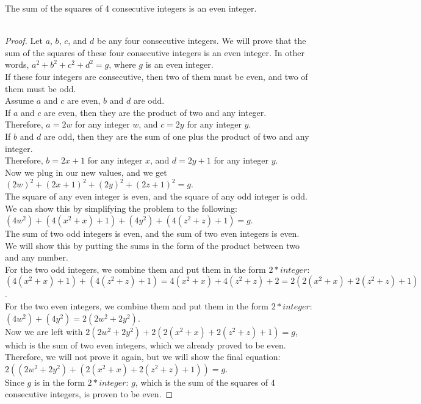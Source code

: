 \documentclass{amsart}
\theoremstyle{definition}
\theoremstyle{Exercise}
\theoremstyle{remark}
\theoremstyle{rule}
\numberwithin{equation}{section}
\begin{document}
The sum of the squares of 4 consecutive integers is an even integer.\\\\
\begin{proof}
Let $a$, $b$, $c$, and $d$ be any four consecutive integers.
We will prove that the sum of the squares of these four consecutive integers is an even integer. In other words, $a^2 + b^2 + c^2 + d^2 = g$, where $g$ is an even integer.\\
If these four integers are consecutive, then two of them must be even, and two of them must be odd.\\
Assume $a$ and $c$ are even, $b$ and $d$ are odd.\\
If $a$ and $c$ are even, then they are the product of two and any integer.\\
Therefore, $a = 2w$ for any integer $w$, and $c = 2y$ for any integer $y$.\\
If $b$ and $d$ are odd, then they are the sum of one plus the product of two and any integer.\\
Therefore, $b = 2x + 1$ for any integer $x$, and $d = 2y + 1$ for any integer $y$.\\
Now we plug in our new values, and we get $(2w)^2 + (2x + 1)^2 + (2y)^2 + (2z + 1)^2 = g$.\\
The square of any even integer is even, and the square of any odd integer is odd. We can show this by simplifying the problem to the following:\\
$(4w^2) + (4(x^2 + x) + 1) + (4y^2) + (4(z^2 + z) + 1) = g$.\\
The sum of two odd integers is even, and the sum of two even integers is even. We will show this by putting the sums in the form of the product between two and any number.\\
For the two odd integers, we combine them and put them in the form $2*integer$:\\
$(4(x^2 + x) + 1) + (4(z^2 + z) + 1) = 4(x^2 + x) + 4(z^2 + z) + 2 = 2(2(x^2 + x) + 2(z^2 + z) + 1)$.\\
For the two even integers, we combine them and put them in the form $2*integer$:\\
$(4w^2) + (4y^2) = 2(2w^2 + 2y^2)$.\\
Now we are left with $2(2w^2 + 2y^2) + 2(2(x^2 + x) + 2(z^2 + z) + 1) = g$, which is the sum of two even integers, which we already proved to be even. Therefore, we will not prove it again, but we will show the final equation:\\ $2((2w^2 + 2y^2) + (2(x^2 + x) + 2(z^2 + z) + 1)) = g$.\\
Since $g$ is in the form $2 * integer$: $g$, which is the sum of the squares of 4 consecutive integers, is proven to be even.
\end{proof}
\\\\
\end{document}
